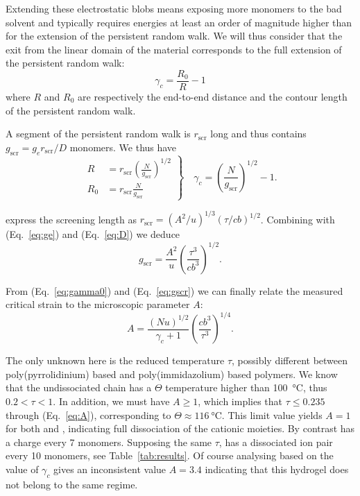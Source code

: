 \documentclass[journal=jacsat,manuscript=article]{achemso}
\begin{document}
Extending these electrostatic blobs means exposing more monomers to the bad solvent and typically requires energies at least an order of magnitude higher than for the extension of the persistent random walk. We will thus consider that the exit from the linear domain of the material corresponds to the full extension of the persistent random walk:
\begin{equation}
\gamma_c = \frac{R_0}{R} - 1
\end{equation}
where $R$ and $R_0$ are respectively the end-to-end distance and the contour length of the persistent random walk.

A segment of the persistent random walk is $r_\mathrm{scr}$ long and thus contains $g_\mathrm{scr} = g_e r_\mathrm{scr}/D$ monomers. We thus have
\begin{equation}
\left. \begin{array}{ll}
R &= r_\mathrm{scr} \left(\frac{N}{g_\mathrm{scr}}\right)^{1/2}\\
R_0 &= r_\mathrm{scr} \frac{N}{g_\mathrm{scr}}
\end{array}\right\rbrace\quad
\gamma_c = \left(\frac{N}{g_\mathrm{scr}}\right)^{1/2} -1\label{eq:gamma0}.
\end{equation}

\citeauthor{Rubinstein1996} express the screening length as
$r_\mathrm{scr} = \left(A^2 / u\right)^{1/3} \left(\tau /cb \right)^{1/2}$. Combining with (Eq.~\ref{eq:ge}) and (Eq.~\ref{eq:D}) we deduce
\begin{equation}
g_\mathrm{scr} = \frac{A^2}{u} \left(\frac{\tau^3}{c b^3}\right)^{1/2}\label{eq:gscr}.
\end{equation}

From (Eq.~\ref{eq:gamma0}) and (Eq.~\ref{eq:gscr}) we can finally relate the measured critical strain to the microscopic parameter $A$:
\begin{equation}
A = \frac{\left(N u\right)^{1/2}}{\gamma_c+1}\left(\frac{c b^3}{\tau^3}\right)^{1/4}.
\label{eq:A}
\end{equation}

The only unknown here is the reduced temperature $\tau$, possibly different between poly(pyrrolidinium) based and poly(immidazolium) based polymers. We know that the undissociated chain has a $\Theta$ temperature higher than \SI{100}{\celsius}, thus $0.2<\tau<1$. In addition, we must have $A\geq 1$, which implies that $\tau\leq 0.235$ through (Eq.~\ref{eq:A}), corresponding to $\Theta\approx\SI{116}{\celsius}$. This limit value yields $A=1$ for both  and , indicating full dissociation of the cationic moieties. By contrast  has a charge every 7 monomers. Supposing the same $\tau$,  has a dissociated ion pair every 10 monomers, see Table~\ref{tab:results}. Of course analysing  based on the value of $\gamma_c$ gives an inconsistent value $A=3.4$ indicating that this hydrogel does not belong to the same regime.
\end{document}
